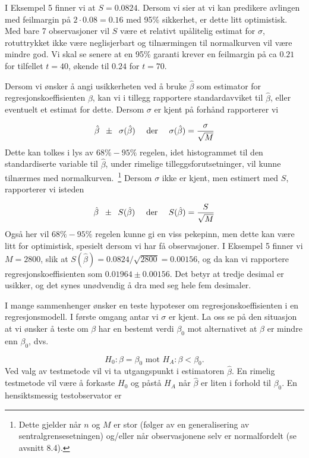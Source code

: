 I Eksempel 5 finner vi at $S=0.0824$. Dersom vi sier at vi kan
predikere avlingen med feilmargin på $2\cdot 0.08=0.16$ med
95\% sikkerhet, er dette litt optimistisk. Med bare 7
observasjoner vil $S$ være et relativt upålitelig estimat
for $\sigma$, rotuttrykket ikke være neglisjerbart og
tilnærmingen til normalkurven vil være mindre god. Vi skal se
senere at en 95\% garanti krever en feilmargin på ca $0.21$
for tilfellet $t=40$, økende til $0.24$ for $t=70$.

Dersom vi ønsker å angi usikkerheten ved å bruke
$\hat{\beta}$ som estimator for regresjonskoeffisienten $\beta$, kan vi
i tillegg rapportere standardavviket til $\hat{\beta}$, eller eventuelt
et estimat for dette. Dersom $\sigma$ er kjent på forhånd
rapporterer vi

\[ \hat{\beta} \;\; \pm \;\; \sigma (\hat{\beta}) \mbox{\ \ \ \ der \ \ \ }
     \sigma (\hat\beta)={\sigma\over \sqrt M}        \]
Dette kan tolkes i lys av $68\% - 95\%$ regelen, idet histogrammet
til den standardiserte variable til $\hat{\beta}$, under rimelige
tilleggsforutsetninger, vil kunne tilnærmes med normalkurven.\
\footnote{Dette gjelder når $n$ og $M$ er stor (følger av
en generalisering av sentralgrensesetningen) og/eller når
observasjonene selv er normalfordelt (se avsnitt 8.4).}
Dersom $\sigma$ ikke er kjent, men estimert med $S$, rapporterer vi isteden

\[ \hat{\beta} \;\; \pm \;\; S(\hat{\beta})\mbox{\ \ \ \ der \ \ \ }
                               S(\hat{\beta})={S\over \sqrt M} \]
Også her vil $68\% - 95\%$ regelen kunne gi en viss pekepinn,
men dette kan være litt for optimistisk, spesielt dersom vi
har få observasjoner. I Eksempel 5 finner vi $M=2800$, slik
at $S(\hat\beta)=0.0824/ \sqrt {2800}=0.00156$, og da kan vi
rapportere regresjonskoeffisienten som $0.01964 \pm 0.00156$.
Det betyr at tredje desimal er usikker, og det synes
unødvendig å dra med seg hele fem desimaler.

I mange sammenhenger ønsker en teste hypoteser om
regresjonskoef\-fisienten i en regresjonsmodell.  I første
omgang antar vi $\sigma$ er kjent. La oss se på den situasjon
at vi ønsker å teste om $\beta$ har en bestemt verdi
$\beta_0$ mot alternativet at $\beta$ er mindre enn $\beta_0$,
dvs.

\[  H_0:\beta ={\beta}_0 \mbox{\ \ mot \ } H_A:\beta < {\beta}_0.\]
Ved valg av testmetode vil vi ta utgangspunkt i estimatoren
$\hat\beta$. En rimelig testmetode vil være å forkaste
$H_0$ og påstå $H_A$ når $\hat\beta$ er liten i
forhold til $\beta_0$. En hensiktsmessig testobservator er

